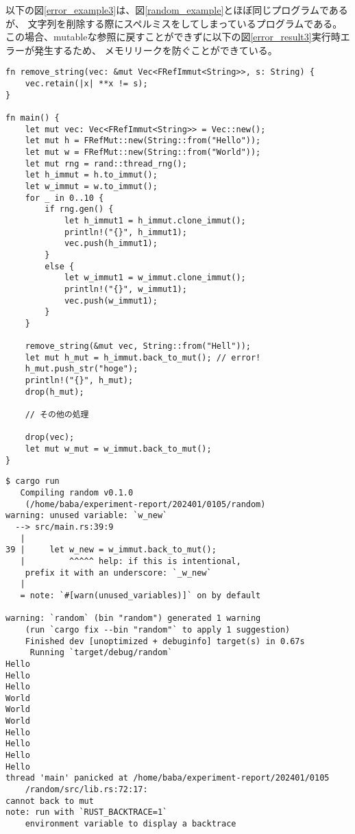 \documentclass{sumiilab-paper}
\theoremstyle{mystyle}
\numberwithin{definition}{chapter} %
\begin{document}
以下の図\ref{error_example3}は、図\ref{random_example}とほぼ同じプログラムであるが、
文字列を削除する際にスペルミスをしてしまっているプログラムである。
この場合、mutableな参照に戻すことができずに以下の図\ref{error_result3}実行時エラーが発生するため、
メモリリークを防ぐことができている。
\begin{lstlisting}[caption=ユーザのミスを検出する例, 
  label=error_example3, captionpos=b]
  fn remove_string(vec: &mut Vec<FRefImmut<String>>, s: String) {
    vec.retain(|x| **x != s);
}

fn main() {
    let mut vec: Vec<FRefImmut<String>> = Vec::new();
    let mut h = FRefMut::new(String::from("Hello"));
    let mut w = FRefMut::new(String::from("World"));
    let mut rng = rand::thread_rng();
    let h_immut = h.to_immut();
    let w_immut = w.to_immut();
    for _ in 0..10 {
        if rng.gen() {
            let h_immut1 = h_immut.clone_immut();
            println!("{}", h_immut1);
            vec.push(h_immut1);
        }
        else {
            let w_immut1 = w_immut.clone_immut();
            println!("{}", w_immut1);
            vec.push(w_immut1);
        }
    }

    remove_string(&mut vec, String::from("Hell"));
    let mut h_mut = h_immut.back_to_mut(); // error!
    h_mut.push_str("hoge");
    println!("{}", h_mut);
    drop(h_mut);

    // その他の処理

    drop(vec);
    let mut w_mut = w_immut.back_to_mut();
}
\end{lstlisting}
\begin{lstlisting}[caption=ユーザのミスによるエラー, 
  label=error_result3, captionpos=b]
$ cargo run
   Compiling random v0.1.0 
    (/home/baba/experiment-report/202401/0105/random)
warning: unused variable: `w_new`
  --> src/main.rs:39:9
   |
39 |     let w_new = w_immut.back_to_mut();
   |         ^^^^^ help: if this is intentional,
    prefix it with an underscore: `_w_new`
   |
   = note: `#[warn(unused_variables)]` on by default

warning: `random` (bin "random") generated 1 warning 
    (run `cargo fix --bin "random"` to apply 1 suggestion)
    Finished dev [unoptimized + debuginfo] target(s) in 0.67s
     Running `target/debug/random`
Hello
Hello
Hello
World
World
World
Hello
Hello
Hello
Hello
thread 'main' panicked at /home/baba/experiment-report/202401/0105
    /random/src/lib.rs:72:17:
cannot back to mut
note: run with `RUST_BACKTRACE=1` 
    environment variable to display a backtrace
\end{lstlisting}
\end{document}
